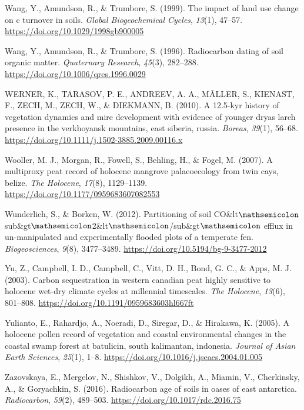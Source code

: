 \documentclass[]{article}
\begin{document}
\leavevmode\hypertarget{ref-Wang_1999}{}%
Wang, Y., Amundson, R., \& Trumbore, S. (1999). The impact of land use
change on c turnover in soils. \emph{Global Biogeochemical Cycles},
\emph{13}(1), 47--57. \url{https://doi.org/10.1029/1998gb900005}

\leavevmode\hypertarget{ref-Wang_1996}{}%
Wang, Y., Amundson, R., \& Trumbore, S. (1996). Radiocarbon dating of
soil organic matter. \emph{Quaternary Research}, \emph{45}(3), 282--288.
\url{https://doi.org/10.1006/qres.1996.0029}

\leavevmode\hypertarget{ref-WERNER_2010}{}%
WERNER, K., TARASOV, P. E., ANDREEV, A. A., MÃLLER, S., KIENAST, F.,
ZECH, M., ZECH, W., \& DIEKMANN, B. (2010). A 12.5-kyr history of
vegetation dynamics and mire development with evidence of younger dryas
larch presence in the verkhoyansk mountains, east siberia, russia.
\emph{Boreas}, \emph{39}(1), 56--68.
\url{https://doi.org/10.1111/j.1502-3885.2009.00116.x}

\leavevmode\hypertarget{ref-Wooller_2007}{}%
Wooller, M. J., Morgan, R., Fowell, S., Behling, H., \& Fogel, M.
(2007). A multiproxy peat record of holocene mangrove palaeoecology from
twin cays, belize. \emph{The Holocene}, \emph{17}(8), 1129--1139.
\url{https://doi.org/10.1177/0959683607082553}

\leavevmode\hypertarget{ref-Wunderlich_2012}{}%
Wunderlich, S., \& Borken, W. (2012). Partitioning of soil
CO\&lt\(\mathsemicolon\)sub\&gt\(\mathsemicolon\)2\&lt\(\mathsemicolon\)/sub\&gt\(\mathsemicolon\)
efflux in un-manipulated and experimentally flooded plots of a temperate
fen. \emph{Biogeosciences}, \emph{9}(8), 3477--3489.
\url{https://doi.org/10.5194/bg-9-3477-2012}

\leavevmode\hypertarget{ref-Yu_2003}{}%
Yu, Z., Campbell, I. D., Campbell, C., Vitt, D. H., Bond, G. C., \&
Apps, M. J. (2003). Carbon sequestration in western canadian peat highly
sensitive to holocene wet-dry climate cycles at millennial timescales.
\emph{The Holocene}, \emph{13}(6), 801--808.
\url{https://doi.org/10.1191/0959683603hl667ft}

\leavevmode\hypertarget{ref-Yulianto_2005}{}%
Yulianto, E., Rahardjo, A., Noeradi, D., Siregar, D., \& Hirakawa, K.
(2005). A holocene pollen record of vegetation and coastal environmental
changes in the coastal swamp forest at batulicin, south kalimantan,
indonesia. \emph{Journal of Asian Earth Sciences}, \emph{25}(1), 1--8.
\url{https://doi.org/10.1016/j.jseaes.2004.01.005}

\leavevmode\hypertarget{ref-Zazovskaya_2016}{}%
Zazovskaya, E., Mergelov, N., Shishkov, V., Dolgikh, A., Miamin, V.,
Cherkinsky, A., \& Goryachkin, S. (2016). Radiocarbon age of soils in
oases of east antarctica. \emph{Radiocarbon}, \emph{59}(2), 489--503.
\url{https://doi.org/10.1017/rdc.2016.75}
\end{document}
